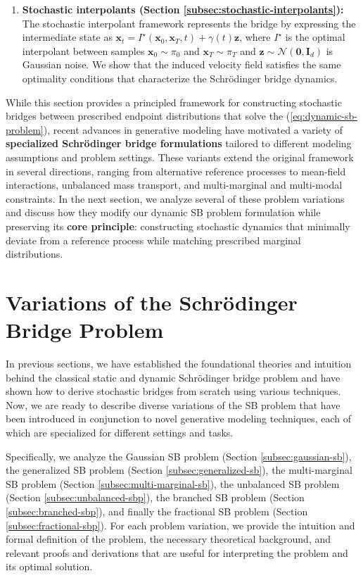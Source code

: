 \documentclass{article}
\begin{document}
\begin{enumerate}
    \item[(vi)] \textbf{Stochastic interpolants (Section \ref{subsec:stochastic-interpolants}):} The stochastic interpolant framework represents the bridge by expressing the intermediate state as $\boldsymbol{x}_t=I^\star(\boldsymbol{x}_0, \boldsymbol{x}_T,t) +\gamma(t)\boldsymbol{z}$, where $I^\star$ is the optimal interpolant between samples $\boldsymbol{x}_0\sim \pi_0$ and $\boldsymbol{x}_T\sim \pi_T$ and $\boldsymbol{z}\sim \mathcal{N}(\boldsymbol{0}, \boldsymbol{I}_d)$ is Gaussian noise. We show that the induced velocity field satisfies the same optimality conditions that characterize the Schrödinger bridge dynamics.
\end{enumerate}

While this section provides a principled framework for constructing stochastic bridges between prescribed endpoint distributions that solve the (\ref{eq:dynamic-sb-problem}), recent advances in generative modeling have motivated a variety of \textbf{specialized Schrödinger bridge formulations} tailored to different modeling assumptions and problem settings. These variants extend the original framework in several directions, ranging from alternative reference processes to mean-field interactions, unbalanced mass transport, and multi-marginal and multi-modal constraints. In the next section, we analyze several of these problem variations and discuss how they modify our dynamic SB problem formulation while preserving its \textbf{core principle}: constructing stochastic dynamics that minimally deviate from a reference process while matching prescribed marginal distributions.

\newpage
\section{Variations of the Schrödinger Bridge Problem}
\label{sec:variations-of-sb}
In previous sections, we have established the foundational theories and intuition behind the classical static and dynamic Schrödinger bridge problem and have shown how to derive stochastic bridges from scratch using various techniques. Now, we are ready to describe diverse variations of the SB problem that have been introduced in conjunction to novel generative modeling techniques, each of which are specialized for different settings and tasks. 

Specifically, we analyze the Gaussian SB problem (Section \ref{subsec:gaussian-sb}), the generalized SB problem (Section \ref{subsec:generalized-sb}), the multi-marginal SB problem (Section \ref{subsec:multi-marginal-sb}), the unbalanced SB problem (Section \ref{subsec:unbalanced-sbp}), the branched SB problem (Section \ref{subsec:branched-sbp}), and finally the fractional SB problem (Section \ref{subsec:fractional-sbp}). For each problem variation, we provide the intuition and formal definition of the problem, the necessary theoretical background, and relevant proofs and derivations that are useful for interpreting the problem and its optimal solution.
\end{document}
